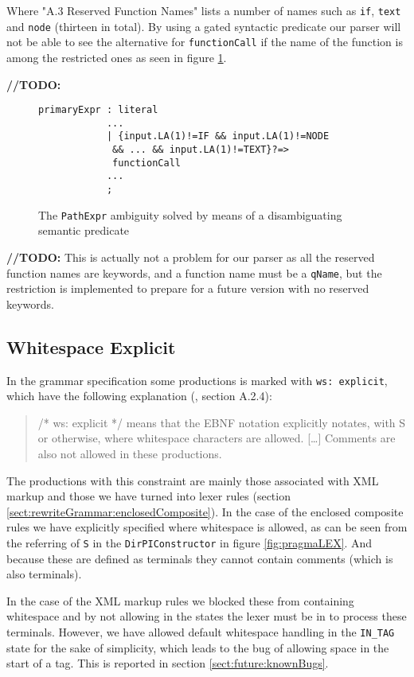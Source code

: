 Where "A.3 Reserved Function Names" lists a number of names such as \verb!if!, \verb!text! and \verb!node! (thirteen in total). By using a gated syntactic predicate our parser will not be able to see the alternative for \verb!functionCall! if the name of the function is among the restricted ones as seen in figure \ref{fig:reservedFunction}.

\textbf{\LARGE //TODO:}
\begin{figure}[h!]
\begin{verbatim}
primaryExpr : literal 
            ...
            | {input.LA(1)!=IF && input.LA(1)!=NODE
             && ... && input.LA(1)!=TEXT}?=>
             functionCall 
            ...
            ;
\end{verbatim}
\caption[The \texttt{PathExpr} ambiguity solved]{The \texttt{PathExpr} ambiguity solved by means of a disambiguating semantic predicate}
\label{fig:reservedFunction}
\end{figure}

\textbf{\LARGE //TODO:} This is actually not a problem for our parser as all the reserved function names are keywords, and a function name must be a \verb!qName!, but the restriction is implemented to prepare for a future version with no reserved keywords.

\subsection{Whitespace Explicit}
\label{sect:implementation:whitespace}
In the grammar specification some productions is marked with \verb!ws: explicit!, which have the following explanation (\cite{w3c00}, section A.2.4):
\begin{quote}
/* ws: explicit */ means that the EBNF notation explicitly notates, with S or otherwise, where whitespace characters are allowed. [\ldots] Comments are also not allowed in these productions.
\end{quote} 

The productions with this constraint are mainly those associated with XML markup and those we have turned into lexer rules (section \ref{sect:rewriteGrammar:enclosedComposite}). In the case of the enclosed composite rules we have explicitly specified where whitespace is allowed, as can be seen from the referring of \verb!S! in the \verb!DirPIConstructor! in figure \ref{fig:pragmaLEX}. And because these are defined as terminals they cannot contain comments (which is also terminals).

In the case of the XML markup rules we blocked these from containing whitespace and by not allowing in the states the lexer must be in to process these terminals. However, we have allowed default whitespace handling in the \verb!IN_TAG! state for the sake of simplicity, which leads to the bug of allowing space in the start of a tag. This is reported in section \ref{sect:future:knownBugs}.

